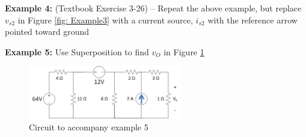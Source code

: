 \documentclass{handout}
\begin{document}
\newpage
\clearpage
\pagebreak

\textbf{Example 4:} (Textbook Exercise 3-26) -- Repeat the above example, but replace $v_{s2}$ in Figure \ref{fig: Example3} with a current source, $i_{s2}$ with the reference arrow pointed toward ground


\newpage
\clearpage
\pagebreak

\textbf{Example 5:}  Use Superposition to find $v_O$ in Figure \ref{fig: Example5}
\begin{figure} [h t b]
\centering
\includegraphics[width=0.6\textwidth]{Example5.jpg}
\caption{Circuit to accompany example 5}
\label{fig: Example5}
\end{figure}
\end{document}
